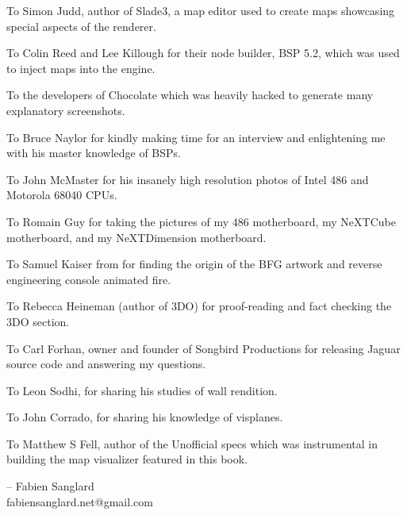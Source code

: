 \par
To Simon Judd, author of Slade3, a map editor used to create maps showcasing special aspects of the renderer.\\
\par
To Colin Reed and Lee Killough for their node builder, BSP 5.2, which was used to inject maps into the\doom{} engine.\\
\par
To the developers of Chocolate \doom{} which was heavily hacked to generate many explanatory screenshots.\\
\par
To Bruce Naylor for kindly making time for an interview and enlightening me with his master knowledge of BSPs.\\
\par
To John McMaster for his insanely high resolution photos of Intel 486 and Motorola 68040 CPUs.\\
\par
To Romain Guy for taking the pictures of my 486 motherboard, my NeXTCube motherboard, and my NeXTDimension motherboard.\\
\par
To Samuel Kaiser from  for finding the origin of the BFG artwork and reverse engineering \doom{} console animated fire.\\
\par
To Rebecca Heineman (author of \doom{} 3DO) for proof-reading and fact checking the 3DO section.\\
\par
To Carl Forhan, owner and founder of Songbird Productions for releasing \doom{} Jaguar source code and answering my questions.\\
\par
To Leon Sodhi, for sharing his studies of \doom{} wall rendition.\\
\par
To John Corrado, for sharing his knowledge of visplanes.\\
\par
To Matthew S Fell, author of the Unofficial \doom{} specs which was instrumental in building the map visualizer featured in this book.\\
\par
\thispagestyle{plain} %
-- Fabien Sanglard\\
fabiensanglard.net@gmail.com
